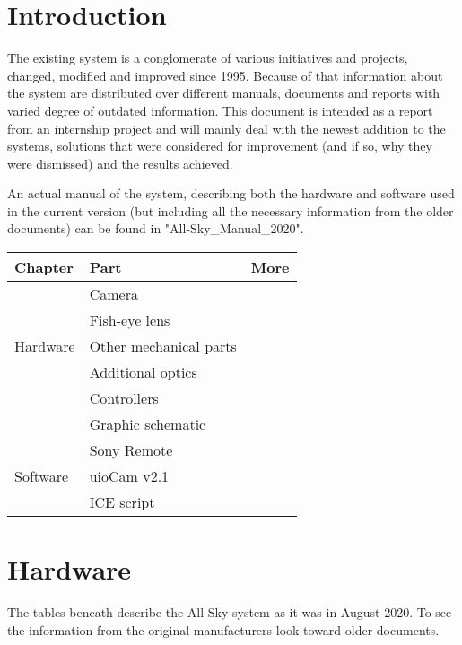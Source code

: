 \documentclass[]{book}
\begin{document}
	\section{Introduction}
	
	The existing system is a conglomerate of various initiatives and projects, changed, modified and improved since 1995. Because of that information about the system are distributed over different manuals, documents and reports with varied degree of outdated information. This document is intended as a report from an internship project and will mainly deal with the newest addition to the systems, solutions that were considered for improvement (and if so, why they were dismissed) and the results achieved.
	
	An actual manual of the system, describing both the hardware and software used in the current version (but including all the necessary information from the older documents) can be found in "All-Sky\_Manual\_2020".
	
	\begin{center}
		\begin{tabular}{|l|l|l|}
			\hline
			Chapter & Part & More \\ \hline
			\multirow{5}{*}{Hardware} & Camera & \\ \cline{2-3}
			& Fish-eye lens & \\ \cline{2-3}
			& Other mechanical parts & \\ \cline{2-3}
			& Additional optics & \\ \cline{2-3}
			& Controllers & \\ \cline{2-3}
			& Graphic schematic & \\ \cline{2-3} \hline
			\multirow{3}{*}{Software} & Sony Remote & \\ \cline{2-3}
			& uioCam v2.1 & \\ \cline{2-3}
			& ICE script & \\ \cline{2-3} \hline
		\end{tabular}
	\end{center}
	
	\section{Hardware}
	
	The tables beneath describe the All-Sky system as it was in August 2020. To see the information from the original manufacturers look toward older documents.
	
\end{document}
